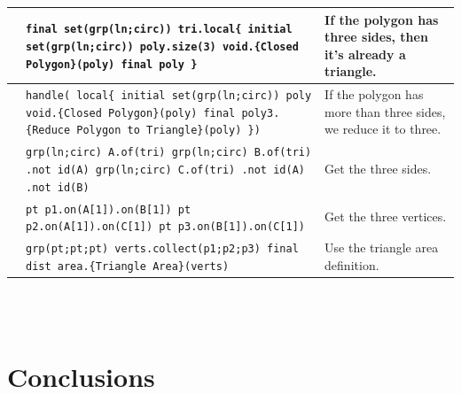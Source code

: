 \documentclass[twoside,11pt]{report}
\begin{document}
\noindent \begin{tabularx}{\textwidth}{l X p{4cm}}
\hspace{3.5cm} & {\tt final set(grp(ln;circ)) tri.local\{ \newline
  initial set(grp(ln;circ)) poly.size(3) \newline
  void.\{Closed Polygon\}(poly) \newline
  final poly \newline
\}} & {\small If the polygon has three sides, then it's already a triangle. } \\
\hline
 & {\tt handle( local\{ \newline
  initial set(grp(ln;circ)) poly \newline
  void.\{Closed Polygon\}(poly) \newline
  final poly3.\{Reduce Polygon to \newline Triangle\}(poly) \newline
\})} & {\small If the polygon has more than three sides, we reduce it to three. } \\
\hline
 & {\tt grp(ln;circ) A.of(tri) \newline
        grp(ln;circ) B.of(tri) \newline
        .not id(A) \newline
        grp(ln;circ) C.of(tri) \newline
        .not id(A) \newline
        .not id(B) } & {\small Get the three sides. } \\
\hline
\vspace{1.5cm} & {\tt pt p1.on(A[1]).on(B[1]) \newline
        pt p2.on(A[1]).on(C[1]) \newline
        pt p3.on(B[1]).on(C[1])} & {\small Get the three vertices. } \\
\hline
\vspace{1.5cm} & {\tt grp(pt;pt;pt) verts.collect(p1;p2;p3) \newline
        final dist area.\{Triangle Area\}(verts)} & {\small Use the triangle area definition. } \\
\end{tabularx}\\\\

\chapter{Conclusions}
\label{chap:conclusions}
\end{document}

